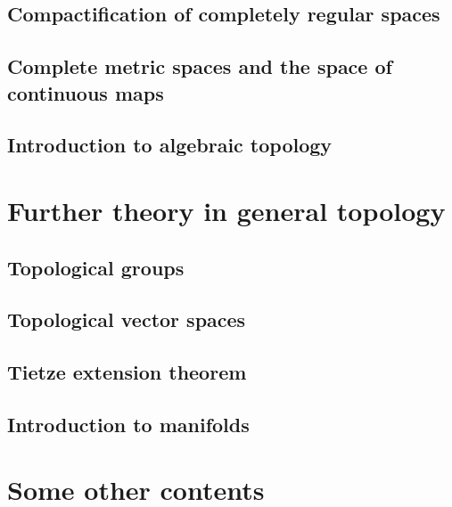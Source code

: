 \chapter{Compactification of completely regular spaces}\label{compactification}
    
    
    

\chapter{Complete metric spaces and the space of continuous maps}\label{completeness and C0 spaces}
    
    
    
    

\chapter{Introduction to algebraic topology}\label{fundamental groups}
    
    
    
    




\part{Further theory in general topology}

\chapter{Topological groups}\label{topological groups}
    
    
    

\chapter{Topological vector spaces}\label{topological vector spaces}
    
    

\chapter{Tietze extension theorem}\label{Tietze extn thm}
    

\chapter{Introduction to manifolds}\label{introduction to manifolds}
    




\part{Some other contents}

